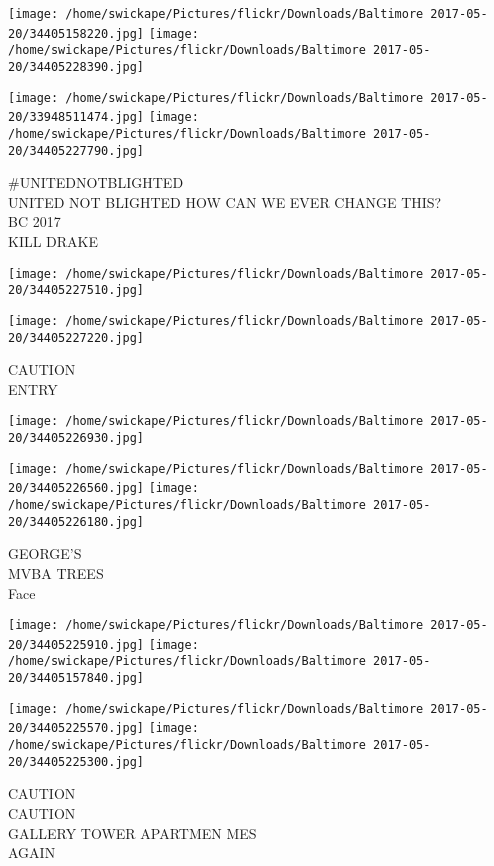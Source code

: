 \documentclass[10pt,letterpaper]{article}
\begin{document}
\texttt{[image: /home/swickape/Pictures/flickr/Downloads/Baltimore 2017-05-20/34405158220.jpg]}
\texttt{[image: /home/swickape/Pictures/flickr/Downloads/Baltimore 2017-05-20/34405228390.jpg]}

\texttt{[image: /home/swickape/Pictures/flickr/Downloads/Baltimore 2017-05-20/33948511474.jpg]}
\texttt{[image: /home/swickape/Pictures/flickr/Downloads/Baltimore 2017-05-20/34405227790.jpg]}

\#UNITEDNOTBLIGHTED\\
UNITED NOT BLIGHTED HOW CAN WE EVER CHANGE THIS?\\
BC 2017\\
KILL DRAKE\\
\pagebreak

\texttt{[image: /home/swickape/Pictures/flickr/Downloads/Baltimore 2017-05-20/34405227510.jpg]}

\vspace{0.25in}
\texttt{[image: /home/swickape/Pictures/flickr/Downloads/Baltimore 2017-05-20/34405227220.jpg]}

CAUTION\\
ENTRY\\
\pagebreak

\texttt{[image: /home/swickape/Pictures/flickr/Downloads/Baltimore 2017-05-20/34405226930.jpg]}

\vspace{0.25in}
\texttt{[image: /home/swickape/Pictures/flickr/Downloads/Baltimore 2017-05-20/34405226560.jpg]}
\texttt{[image: /home/swickape/Pictures/flickr/Downloads/Baltimore 2017-05-20/34405226180.jpg]}

GEORGE'S\\
MVBA TREES\\
Face\\
\pagebreak

\texttt{[image: /home/swickape/Pictures/flickr/Downloads/Baltimore 2017-05-20/34405225910.jpg]}
\texttt{[image: /home/swickape/Pictures/flickr/Downloads/Baltimore 2017-05-20/34405157840.jpg]}

\texttt{[image: /home/swickape/Pictures/flickr/Downloads/Baltimore 2017-05-20/34405225570.jpg]}
\texttt{[image: /home/swickape/Pictures/flickr/Downloads/Baltimore 2017-05-20/34405225300.jpg]}

CAUTION\\
CAUTION\\
GALLERY TOWER APARTMEN MES\\
AGAIN\\
\pagebreak
\end{document}
